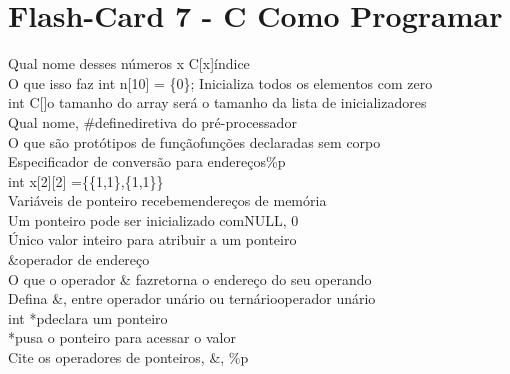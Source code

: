 \documentclass[a4paper,12pt]{article}
\begin{document}
\section*{Flash-Card 7 - C Como Programar} 
Qual nome desses números x C[x]\dotfill índice\\ 
O que isso faz int n[10] = \{0\}; \dotfill Inicializa todos os elementos com zero\\ 
int C[\;]\dotfill o tamanho do array será o tamanho da lista de inicializadores\\
Qual nome, \#define\dotfill diretiva do pré-processador\\ 
O que são protótipos de função\dotfill funções declaradas sem corpo\\ 
Especificador de conversão para endereços\dotfill \%p\\ 
int x[2][2] =\dotfill \{\{1,1\},\{1,1\}\}\\ 
Variáveis de ponteiro recebem\dotfill endereços de memória\\  
Um ponteiro pode ser inicializado com\dotfill NULL, 0\\ 
Único valor inteiro para atribuir a um ponteiro\\ 
\&\dotfill operador de endereço\\  
O que o operador \& faz\dotfill retorna o endereço do seu operando\\
Defina \&, entre operador unário ou ternário\dotfill operador unário\\ 
int *p\dotfill declara um ponteiro\\ 
*p\dotfill usa o ponteiro para acessar o valor\\ 
Cite os operadores de ponteiros\dotfill *, \&, \%p\\ 
\end{document}
